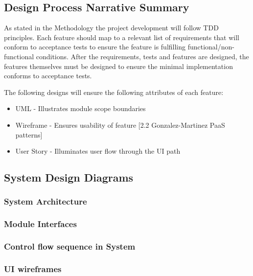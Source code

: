 \documentclass{article}
\begin{document}
\subsection{Design Process Narrative Summary}
As stated in the Methodology the project development will follow TDD principles. Each feature should map to a relevant list of requirements that will conform to acceptance tests to ensure the feature is fulfilling functional/non-functional conditions. After the requirements, tests and features are designed, the features themselves must be designed to ensure the minimal implementation conforms to acceptance tests.

The following designs will ensure the following attributes of each feature:

\begin{itemize}
\item UML - Illustrates module scope boundaries
\item Wireframe - Ensures usability of feature [2.2 Gonzalez-Martinez PaaS patterns]
\item User Story - Illuminates user flow through the UI path
\end{itemize} %


\subsection{System Design Diagrams} %
\subsubsection{System Architecture}

\subsubsection{Module Interfaces}

\subsubsection{Control flow sequence in System}

\subsubsection{UI wireframes}
\end{document}
